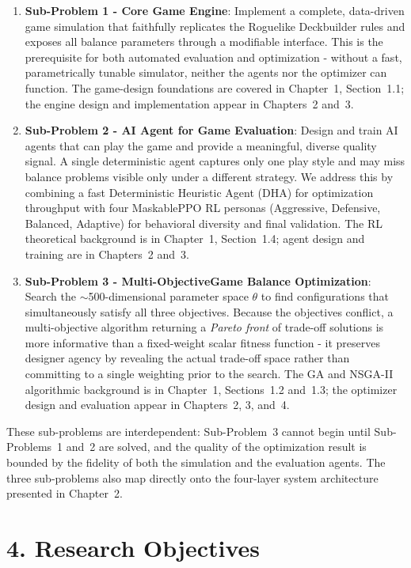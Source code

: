 \begin{enumerate}
    \item \textbf{Sub-Problem 1 - Core Game Engine}: Implement a complete, data-driven game simulation that faithfully replicates the Roguelike Deckbuilder rules and exposes all balance parameters through a modifiable interface. This is the prerequisite for both automated evaluation and optimization - without a fast, parametrically tunable simulator, neither the agents nor the optimizer can function. The game-design foundations are covered in Chapter~1, Section~1.1; the engine design and implementation appear in Chapters~2 and~3.
    \item \textbf{Sub-Problem 2 - AI Agent for Game Evaluation}: Design and train AI agents that can play the game and provide a meaningful, diverse quality signal. A single deterministic agent captures only one play style and may miss balance problems visible only under a different strategy. We address this by combining a fast Deterministic Heuristic Agent (DHA) for optimization throughput with four MaskablePPO RL personas (Aggressive, Defensive, Balanced, Adaptive) for behavioral diversity and final validation. The RL theoretical background is in Chapter~1, Section~1.4; agent design and training are in Chapters~2 and~3.
    \item \textbf{Sub-Problem 3 - Multi-Objective}\newline\textbf{Game Balance Optimization}: Search the $\sim$500-dimensional parameter space $\theta$ to find configurations that simultaneously satisfy all three objectives. Because the objectives conflict, a multi-objective algorithm returning a \emph{Pareto front} of trade-off solutions is more informative than a fixed-weight scalar fitness function - it preserves designer agency by revealing the actual trade-off space rather than committing to a single weighting prior to the search. The GA and NSGA-II algorithmic background is in Chapter~1, Sections~1.2 and~1.3; the optimizer design and evaluation appear in Chapters~2, 3, and~4.
\end{enumerate}

These sub-problems are interdependent: Sub-Problem~3 cannot begin until Sub-Problems~1 and~2 are solved, and the quality of the optimization result is bounded by the fidelity of both the simulation and the evaluation agents. The three sub-problems also map directly onto the four-layer system architecture presented in Chapter~2.

\section*{4. Research Objectives}

